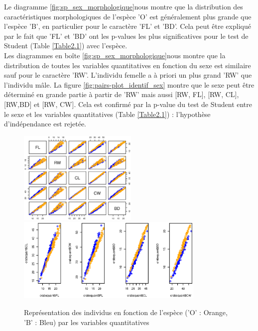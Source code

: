 \documentclass{article}
\begin{document}
Le diagramme \lbrack\ref{fig:sp_sex_morphologique}\rbrack nous montre que la distribution des caractéristiques morphologiques de l'espèce 'O' est généralement plus grande que l'espèce 'B', en particulier pour le caractère 'FL' et 'BD'. Cela peut être expliqué par le fait que 'FL' et 'BD' ont les p-values les plus significatives pour le test de Student (Table \ref{Table2.1}) avec l'espèce.\\
Les diagrammes en boîte \lbrack\ref{fig:sp_sex_morphologique}\rbrack nous montre que la distribution de toutes les variables quantitatives en fonction du sexe est similaire sauf pour le caractère 'RW'. L'individu femelle a à priori un plus grand 'RW' que l'individu mâle. La figure \ref{fig:pairs-plot_identif_sex} montre que le sexe peut être déterminé en grande partie à partir de 'RW' mais aussi [RW, FL], [RW, CL], [RW,BD] et [RW, CW].
Cela est confirmé par la p-value du test de Student entre le sexe et les variables quantitatives (Table \ref{Table2.1}) : l'hypothèse d'indépendance est rejetée.
\begin{figure}[!ht]
\centering
\includegraphics[width=5.7cm]{./img/1-2-pairs-plot_sp.eps}
\includegraphics[width=9cm]{./img/1-2-pairs_identif_sp.eps}
\caption{Représentation des individus en fonction de l'espèce ('O' : Orange, 'B' : Bleu) par les variables quantitatives}
\label{fig:pairs-plot_sp}
\end{figure}


\end{document}
